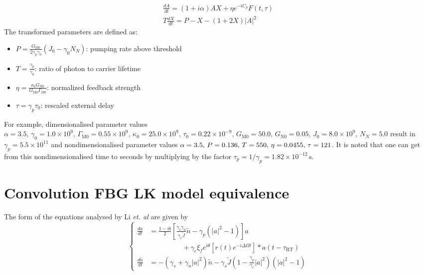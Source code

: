 %
\[
\begin{gathered}
\frac{d A}{d t} = (1 + i \alpha) A X + \eta e^{-i C_p} F(t,\tau) \\
T \frac{d X}{d t} = P - X - (1 + 2X)|A|^2
\end{gathered}
\]
%
The transformed parameters are defined as:
%
\begin{itemize}
  \item \( P = \frac{G_{\mathrm{M}0}}{2 \gamma_p \gamma_0}(J_0 - \gamma_0 N_N) \): pumping rate above threshold
  \item \( T = \frac{\gamma_p}{\gamma_0} \): ratio of photon to carrier lifetime
  \item \( \eta = \frac{\kappa_0 G_{\mathrm{N}0}}{G_{\mathrm{M}0} \Gamma_{\mathrm{M}0}} \): normalized feedback strength
  \item \( \tau = \gamma_p \tau_0 \): rescaled external delay
\end{itemize}
%
For example, dimensionalised parameter values $\alpha = 3.5, \, \gamma_0 = 1.0 \times 10^9, \, \Gamma_{\mathrm{M}0} = 0.55 \times 10^9,\,
\kappa_0 = 25.0 \times 10^9, \, \tau_0 = 0.22 \times 10^{-9}, \, G_{\mathrm{M}0} = 50.0, \, G_{\mathrm{N}0} = 0.05, \, J_0 = 8.0 \times 10^9, \,
N_N = 5.0$ result in $\gamma_p = 5.5 \times 10^{11}$ and nondimensionalised parameter values $\alpha = 3.5, \, P = 0.136, \, T = 550, \, \eta = 0.0455, \, \tau = 121$.
%
It is noted that one can get from this nondimensionalised time to seconds by multiplying by the factor $\tau_p = 1/\gamma_p = 1.82 \times 10^{-12}\,\text{s}$.
%
%
\section{Convolution FBG LK model equivalence}
\label{sec:Li_chaos_nondim}
%
The form of the equations analysed by Li \textit{et. al} \cite{li2012distributed,li2015chaotic,li2020stable} are given by
%
\begin{equation}
\left\{
\begin{aligned}
\frac{d a}{d t} &= \frac{1-i b}{2}
   \left[\frac{\gamma_{c} \gamma_{n}}{\gamma_{s} \tilde{J}} \tilde{n}
         - \gamma_{p}\left(|a|^{2}-1\right)\right] a \\
&\hspace{2cm} + \gamma_{c} \xi_{f} e^{i \theta}
   \left[r(t) e^{-i \Delta \Omega t}\right] * a\!\left(t-\tau_\text{RT}\right) \\
\frac{d \tilde{n}}{d t} &= -\left(\gamma_{s}+\gamma_{n}|a|^{2}\right) \tilde{n}
   - \gamma_{s} \tilde{J}\left(1-\frac{\gamma_{p}}{\gamma_{c}}|a|^{2}\right)
   \left(|a|^{2}-1\right)
\end{aligned}
\right.
\end{equation}

